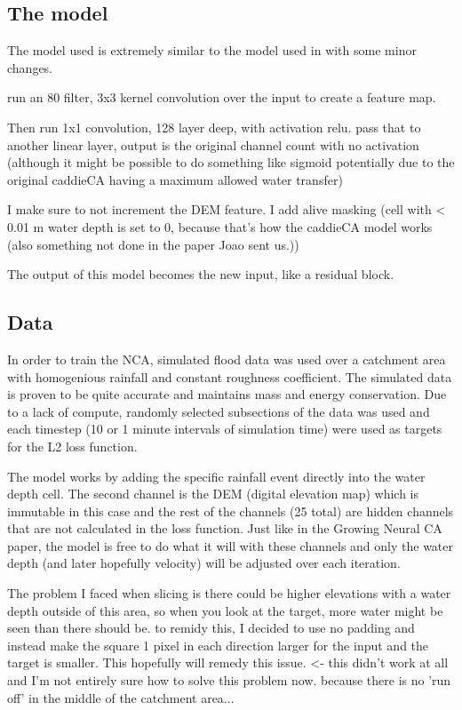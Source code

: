 \documentclass{article}
\begin{document}
\subsection{The model}
	The model used is extremely similar to the model used in \cite{mordvintsev2020growing} with some minor changes.
	
	run an 80 filter, 3x3 kernel convolution over the input to create a feature map.
	
	Then run 1x1 convolution, 128 layer deep, with activation relu.
	pass that to another linear layer, output is the original channel count with no activation (although it might be possible to do something like sigmoid potentially due to the original caddieCA having a maximum allowed water transfer)
	
	I make sure to not increment the DEM feature. I add alive masking (cell with \textless{} {0.01} m water depth is set to 0, because that's how the caddieCA model works (also something not done in the paper Joao sent us.))
	
	The output of this model  becomes the new input, like a residual block.
	
\subsection{Data}
	In order to train the NCA, simulated flood data was used over a catchment area with homogenious rainfall and constant roughness coefficient. The simulated data is proven to be quite accurate and maintains mass and energy conservation. Due to a lack of compute, randomly selected subsections of the data was used and each timestep (10 or 1 minute intervals of simulation time) were used as targets for the L2 loss function.
	
	The model works by adding the specific rainfall event directly into the water depth cell. The second channel is the DEM (digital elevation map) which is immutable in this case and the rest of the channels (25 total) are hidden channels that are not calculated in the loss function. Just like in the Growing Neural CA paper, the model is free to do what it will with these channels and only the water depth (and later hopefully velocity) will be adjusted over each iteration.
	
	The problem I faced when slicing is there could be higher elevations with a water depth outside of this area, so when you look at the target, more water might be seen than there should be. to remidy this, I decided to use no padding and instead make the square 1 pixel in each direction larger for the input and the target is smaller. This hopefully will remedy this issue. <- this didn't work at all and I'm not entirely sure how to solve this problem now. because there is no 'run off' in the middle of the catchment area...
\end{document}
